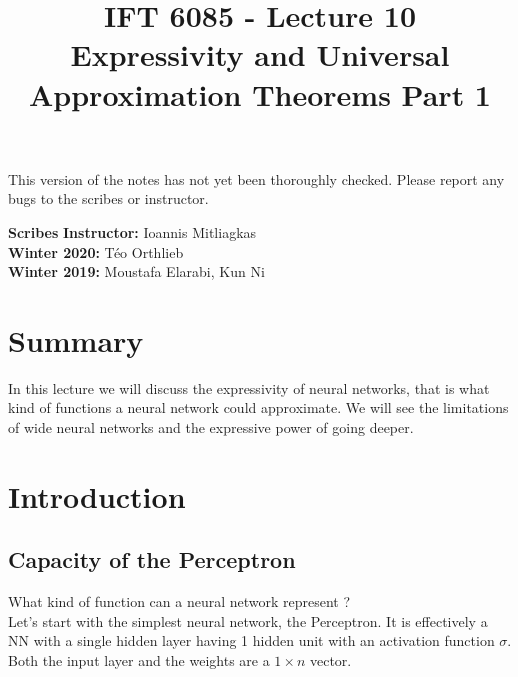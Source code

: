 \documentclass{article}
\title{IFT 6085 - Lecture 10 \\ 
Expressivity and Universal Approximation Theorems Part 1}
\date{}
\begin{document}
 

\maketitle

\vspace{-0.5in}
\begin{center}
This version of the notes has not yet been thoroughly checked.
Please report any bugs to the scribes or instructor.
\end{center}
\vspace{0.2in}

\textbf{Scribes}\hfill
\textbf{Instructor:}  Ioannis Mitliagkas \\
\textbf{Winter 2020:} Téo Orthlieb \\
\textbf{Winter 2019:} Moustafa Elarabi, Kun Ni \\

\newcommand{\infgc}{\inf_{g \in \mathcal{C}}}
\newcommand{\supgc}{\sup_{g \in \mathcal{C}}}
\newcommand{\Prob}{\mathbb{P}}
\newcommand{\E}{\mathbb{E}}
\newcommand{\reals}{\mathbb{R}}


\section{Summary}

In this lecture we will discuss the expressivity of neural networks, that is what kind of functions a neural network could approximate. 
We will see the limitations of wide neural networks and the expressive power of going deeper.


\section{Introduction}

\subsection{Capacity of the Perceptron}
What kind of function can a neural network represent ? \\

Let's start with the simplest neural network, the Perceptron.
It is effectively a NN with a single hidden layer having 1 hidden unit with an activation function $\sigma$. Both the input layer and the weights are a $1 \times n$ vector.
\end{document}
